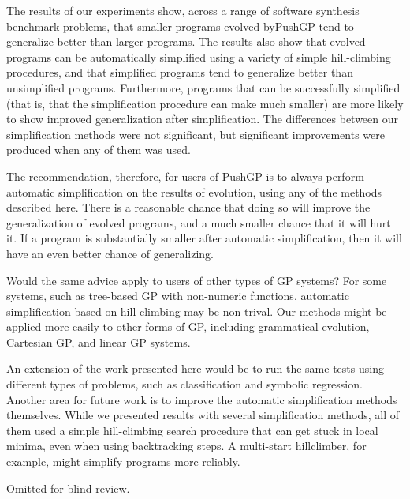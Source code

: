 The results of our experiments show, across a range of software synthesis benchmark problems, that smaller programs evolved byPushGP tend to generalize better than larger programs. The results also show that evolved programs can be automatically simplified using a variety of simple hill-climbing procedures, and that simplified programs tend to generalize better than unsimplified programs. Furthermore, programs that can be successfully simplified (that is, that the simplification procedure can make much smaller) are more likely to show improved generalization after simplification. The differences between our simplification methods were not significant, but significant improvements were produced when any of them was used.

The recommendation, therefore, for users of PushGP is to always perform automatic simplification on the results of evolution, using any of the methods described here. There is a reasonable chance that doing so will improve the generalization of evolved programs, and a much smaller chance that it will hurt it. If a program is substantially smaller after automatic simplification, then it will have an even better chance of generalizing.

Would the same advice apply to users of other types of GP systems? For some systems, such as tree-based GP with non-numeric functions, automatic simplification based on hill-climbing may be non-trival. Our methods might be applied more easily to other forms of GP, including grammatical evolution, Cartesian GP, and linear GP systems.

An extension of the work presented here would be to run the same tests using different types of problems, such as classification and symbolic regression. Another area for future work is to improve the automatic simplification methods themselves. While we presented results with several simplification methods, all of them used a simple hill-climbing search procedure that can get stuck in local minima, even when using backtracking steps. A multi-start hillclimber, for example, might simplify programs more reliably.


\begin{acks}
  
Omitted for blind review.

\end{acks}
